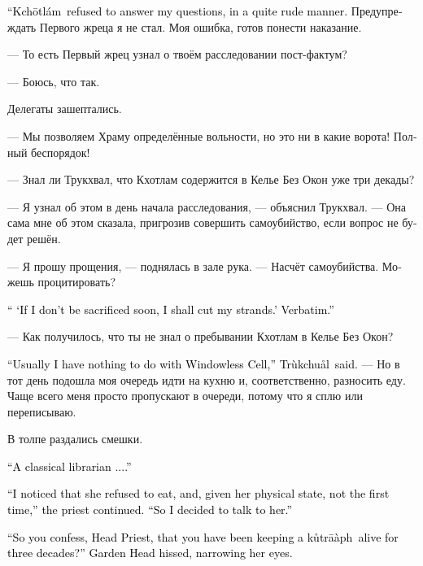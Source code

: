 \documentclass[a4paper,12pt,fleqn]{book}\usepackage{cooltooltips}\usepackage{polyglossia}\setdefaultlanguage[babelshorthands=true]{russian}\setotherlanguage{english}\defaultfontfeatures{Ligatures=TeX,Mapping=tex-text} \usepackage{xcolor}\definecolor{lightgray}{HTML}{bbbbbb}\color{lightgray}\newcommand{\ml}[3]{\textenglish{\textcolor{black}{#3}} }
\newcommand{\Kchotlam}{Kch\={o}tl\'{a}m}
\newcommand{\kutraph}{k\r{u}tr\={a}\`{a}ph}
\newcommand{\Trukchual}{Tr\`{u}kchu\r{a}l}
\begin{document}
\ml{$0$}
{--- Кхотлам отказалась отвечать на мои вопросы, в довольно грубой форме.}
{``\Kchotlam\ refused to answer my questions, in a quite rude manner.}
Предупреждать Первого жреца я не стал.
Моя ошибка, готов понести наказание.

--- То есть Первый жрец узнал о твоём расследовании пост-фактум?

--- Боюсь, что так.

Делегаты зашептались.

--- Мы позволяем Храму определённые вольности, но это ни в какие ворота!
Полный беспорядок!

--- Знал ли Трукхвал, что Кхотлам содержится в Келье Без Окон уже три декады?

--- Я узнал об этом в день начала расследования, --- объяснил Трукхвал.
--- Она сама мне об этом сказала, пригрозив совершить самоубийство, если вопрос не будет решён.

--- Я прошу прощения, --- поднялась в зале рука.
--- Насчёт самоубийства.
Можешь процитировать?

\ml{$0$}
{--- <<Если меня не принесут в жертву в ближайшее время, я перережу себе жилы>>.}
{`` `If I don't be sacrificed soon, I shall cut my strands.'}
\ml{$0$}
{Это дословно.}
{Verbatim.''}

--- Как получилось, что ты не знал о пребывании Кхотлам в Келье Без Окон?

\ml{$0$}
{--- Обычно я не имею никакого отношения к Келье Без Окон, --- сказал Трукхвал.}
{``Usually I have nothing to do with Windowless Cell,'' \Trukchual\ said.}
--- Но в тот день подошла моя очередь идти на кухню и, соответственно, разносить еду.
Чаще всего меня просто пропускают в очереди, потому что я сплю или переписываю.

В толпе раздались смешки.

\ml{$0$}
{--- Типичный библиотекарь...}
{``A classical librarian ....''}

\ml{$0$}
{--- Я обратил внимание, что она отказалась от еды, и судя по её состоянию, уже не впервые, --- продолжил жрец.}
{``I noticed that she refused to eat, and, given her physical state, not the first time,'' the priest continued.}
\ml{$0$}
{--- Поэтому решил поговорить.}
{``So I decided to talk to her.''}

\ml{$0$}
{--- Так, значит, Первый жрец, ты признаёшь, что держал кутрапа живым три декады? --- сузив глаза, прошипела старшина Сада.}
{``So you confess, Head Priest, that you have been keeping a \kutraph\ alive for three decades?'' Garden Head hissed, narrowing her eyes.}
\end{document}
